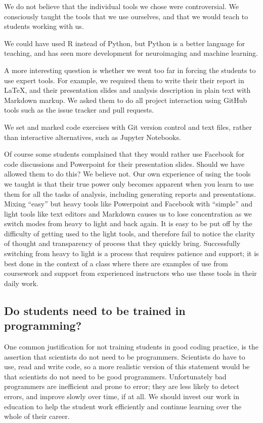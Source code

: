 We do not believe that the individual tools we chose were controversial. We
consciously taught the tools that we use ourselves, and that we would teach to
students working with us.

We could have used R instead of Python, but Python is a better language for
teaching, and has seen more development for neuroimaging and machine learning.

A more interesting question is whether we went too far in forcing the students
to use expert tools.  For example, we required them to write their their
report in \LaTeX, and their presentation slides and analysis description in
plain text with Markdown markup.  We asked them to do all project interaction
using GitHub tools such as the issue tracker and pull requests.

We set and marked code exercises with Git version control and text files,
rather than interactive alternatives, such as Jupyter Notebooks.

Of course some students complained that they would rather use Facebook for
code discussions and Powerpoint for their presentation slides.
Should we have allowed them to do this?  We believe not.  Our own experience
of using the tools we taught is that their true power only becomes apparent
when you learn to use them for all the tasks of analysis, including generating
reports and presentations.  Mixing ``easy'' but heavy tools like Powerpoint
and Facebook with ``simple'' and light tools like text editors and Markdown
causes us to lose concentration as we switch modes from heavy to light and
back again. It is easy to be put off by the difficulty of getting used to the
light tools, and therefore fail to notice the clarity of thought and
transparency of process that they quickly bring.  Successfully switching from
heavy to light is a process that requires patience and support; it is best
done in the context of a class where there are examples of use from coursework
and support from experienced instructors who use these tools in their daily
work.


\subsection{Do students need to be trained in programming?}

One common justification for not training students in good coding practice, is
the assertion that scientists do not need to be programmers.  Scientists do
have to use, read and write code, so a more realistic version of this
statement would be that scientists do not need to be good programmers.
Unfortunately bad programmers are inefficient and prone to error; they are
less likely to detect errors, and improve slowly over time, if at all.  We
should invest our work in education to help the student work efficiently and
continue learning over the whole of their career.

